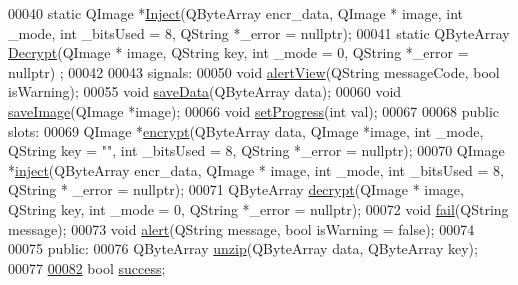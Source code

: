\begin{DoxyCode}
00040     \textcolor{keyword}{static} QImage *\hyperlink{class_model_p_c_ac17e68e6aab134621b0d151d74acdc82}{Inject}(QByteArray encr\_data, QImage * image, \textcolor{keywordtype}{int} \_mode, \textcolor{keywordtype}{int} \_bitsUsed = 8, QString
       *\_error = \textcolor{keyword}{nullptr});
00041     \textcolor{keyword}{static} QByteArray \hyperlink{class_model_p_c_a902abaea4f07995b48c0f2fea6eceb7c}{Decrypt}(QImage * image, QString key, \textcolor{keywordtype}{int} \_mode = 0, QString *\_error = \textcolor{keyword}{nullptr})
      ;
00042 
00043 signals:
00050     \textcolor{keywordtype}{void} \hyperlink{class_model_p_c_af0217a7ca5671e26090dc50a5dccdaf5}{alertView}(QString messageCode, \textcolor{keywordtype}{bool} isWarning);
00055     \textcolor{keywordtype}{void} \hyperlink{class_model_p_c_a0855107fb0ccc247cd9e893fae9bb08a}{saveData}(QByteArray data);
00060     \textcolor{keywordtype}{void} \hyperlink{class_model_p_c_a41f5e2e8022679046e4d3fa1109025fa}{saveImage}(QImage *image);
00066     \textcolor{keywordtype}{void} \hyperlink{class_model_p_c_afdcd80f0ed5062e145a71f09b0897547}{setProgress}(\textcolor{keywordtype}{int} val);
00067 
00068 \textcolor{keyword}{public} slots:
00069     QImage *\hyperlink{class_model_p_c_a6f191f62d4635d0d3555fcc0be298794}{encrypt}(QByteArray data, QImage *image, \textcolor{keywordtype}{int} \_mode, QString key = \textcolor{stringliteral}{""}, \textcolor{keywordtype}{int} \_bitsUsed = 8, 
      QString *\_error = \textcolor{keyword}{nullptr});
00070     QImage *\hyperlink{class_model_p_c_aada6a04d81ada8f2b4ba18108c8d6f10}{inject}(QByteArray encr\_data, QImage * image, \textcolor{keywordtype}{int} \_mode, \textcolor{keywordtype}{int} \_bitsUsed = 8, QString *
      \_error = \textcolor{keyword}{nullptr});
00071     QByteArray \hyperlink{class_model_p_c_a5995215a34a1e1f504035715a8013809}{decrypt}(QImage * image, QString key, \textcolor{keywordtype}{int} \_mode = 0, QString *\_error = \textcolor{keyword}{nullptr});
00072     \textcolor{keywordtype}{void} \hyperlink{class_model_p_c_a47464b59b7e37fcee25e55475708aabd}{fail}(QString message);
00073     \textcolor{keywordtype}{void} \hyperlink{class_model_p_c_a9079a101d83672aa48fd2dbac797de40}{alert}(QString message, \textcolor{keywordtype}{bool} isWarning = \textcolor{keyword}{false});
00074 
00075 \textcolor{keyword}{public}:
00076     QByteArray \hyperlink{class_model_p_c_a6da88f166785a49f73b22c169f956fd0}{unzip}(QByteArray data, QByteArray key);
00077 
\hypertarget{modelpc_8h_source.tex_l00082}{}\hyperlink{class_model_p_c_a945ffbbc44a832b953c191debd448f4c}{00082}     \textcolor{keywordtype}{bool} \hyperlink{class_model_p_c_a945ffbbc44a832b953c191debd448f4c}{success};

\end{DoxyCode}
